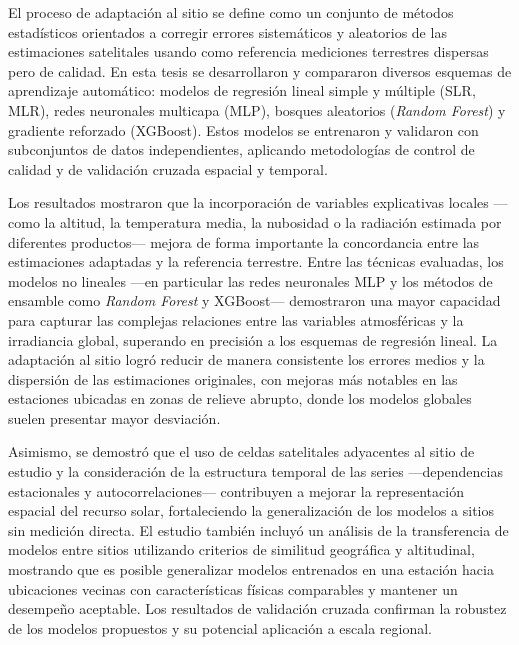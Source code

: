El proceso de adaptación al sitio se define como un conjunto de métodos estadísticos
orientados a corregir errores sistemáticos y aleatorios de las estimaciones satelitales usando
como referencia mediciones terrestres dispersas pero de calidad. En esta tesis se desarrollaron
y compararon diversos esquemas de aprendizaje automático: modelos de regresión lineal simple
y múltiple (SLR, MLR), redes neuronales multicapa (MLP), bosques aleatorios
(\textit{Random Forest}) y gradiente reforzado (XGBoost). Estos modelos se entrenaron y
validaron con subconjuntos de datos independientes, aplicando metodologías de control de
calidad y de validación cruzada espacial y temporal.
 
Los resultados mostraron que la incorporación de variables explicativas locales ---como la
altitud, la temperatura media, la nubosidad o la radiación estimada por diferentes
productos--- mejora de forma importante la concordancia entre las estimaciones adaptadas y la
referencia terrestre. Entre las técnicas evaluadas, los modelos no lineales ---en particular
las redes neuronales MLP y los métodos de ensamble como \textit{Random Forest} y XGBoost---
demostraron una mayor capacidad para capturar las complejas relaciones entre las variables
atmosféricas y la irradiancia global, superando en precisión a los esquemas de regresión
lineal. La adaptación al sitio logró reducir de manera consistente los errores medios y la
dispersión de las estimaciones originales, con mejoras más notables en las estaciones ubicadas
en zonas de relieve abrupto, donde los modelos globales suelen presentar mayor desviación.
 
Asimismo, se demostró que el uso de celdas satelitales adyacentes al sitio de estudio y la
consideración de la estructura temporal de las series ---dependencias estacionales y
autocorrelaciones--- contribuyen a mejorar la representación espacial del recurso solar,
fortaleciendo la generalización de los modelos a sitios sin medición directa. El estudio
también incluyó un análisis de la transferencia de modelos entre sitios utilizando criterios
de similitud geográfica y altitudinal, mostrando que es posible generalizar modelos entrenados
en una estación hacia ubicaciones vecinas con características físicas comparables y mantener
un desempeño aceptable. Los resultados de validación cruzada confirman la robustez de los
modelos propuestos y su potencial aplicación a escala regional.
 
